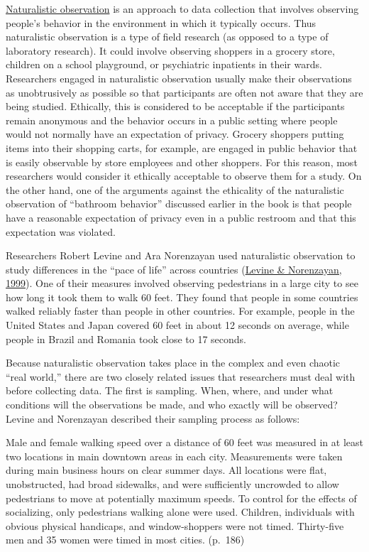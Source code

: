 \documentclass[
]{krantz}
\begin{document}
\protect\hyperlink{naturalistic-observation-1}{Naturalistic observation} is an approach to data collection that involves observing people's behavior in the environment in which it typically occurs. Thus naturalistic observation is a type of field research (as opposed to a type of laboratory research). It could involve observing shoppers in a grocery store, children on a school playground, or psychiatric inpatients in their wards. Researchers engaged in naturalistic observation usually make their observations as unobtrusively as possible so that participants are often not aware that they are being studied. Ethically, this is considered to be acceptable if the participants remain anonymous and the behavior occurs in a public setting where people would not normally have an expectation of privacy. Grocery shoppers putting items into their shopping carts, for example, are engaged in public behavior that is easily observable by store employees and other shoppers. For this reason, most researchers would consider it ethically acceptable to observe them for a study. On the other hand, one of the arguments against the ethicality of the naturalistic observation of ``bathroom behavior'' discussed earlier in the book is that people have a reasonable expectation of privacy even in a public restroom and that this expectation was violated.

Researchers Robert Levine and Ara Norenzayan used naturalistic observation to study differences in the ``pace of life'' across countries (\protect\hyperlink{ref-levine1999pace}{Levine \& Norenzayan, 1999}). One of their measures involved observing pedestrians in a large city to see how long it took them to walk 60 feet. They found that people in some countries walked reliably faster than people in other countries. For example, people in the United States and Japan covered 60 feet in about 12 seconds on average, while people in Brazil and Romania took close to 17 seconds.

Because naturalistic observation takes place in the complex and even chaotic ``real world,'' there are two closely related issues that researchers must deal with before collecting data. The first is sampling. When, where, and under what conditions will the observations be made, and who exactly will be observed? Levine and Norenzayan described their sampling process as follows:

Male and female walking speed over a distance of 60 feet was measured in at least two locations in main downtown areas in each city. Measurements were taken during main business hours on clear summer days. All locations were flat, unobstructed, had broad sidewalks, and were sufficiently uncrowded to allow pedestrians to move at potentially maximum speeds. To control for the effects of socializing, only pedestrians walking alone were used. Children, individuals with obvious physical handicaps, and window-shoppers were not timed. Thirty-five men and 35 women were timed in most cities. (p.~186)
\end{document}
